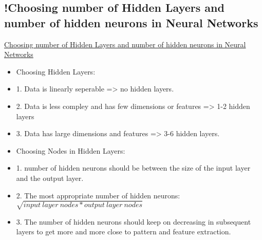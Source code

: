 \subsection{!Choosing number of Hidden Layers and number of hidden neurons in Neural Networks}
\href{https://www.linkedin.com/pulse/choosing-number-hidden-layers-neurons-neural-networks-sachdev}{Choosing number of Hidden Layers and number of hidden neurons in Neural Networks}
\begin{itemize}[noitemsep,nolistsep]
	\item Choosing Hidden Layers:
	\item 1. Data is linearly seperable => no hidden layers.
	\item 2. Data is less compley and has few dimensions or features => 1-2 hidden layers
	\item 3. Data has large dimensions and features => 3-6 hidden layers.
	\item Choosing Nodes in Hidden Layers:
	\item 1. number of hidden neurons should be between the size of the input layer and the output layer.
	\item 2. The most appropriate number of hidden neurons: $\sqrt{input\ layer\ nodes * output\ layer\ nodes}$
	\item 3. The number of hidden neurons should keep on decreasing in subsequent layers to get more and more close to pattern and feature extraction.
\end{itemize}

